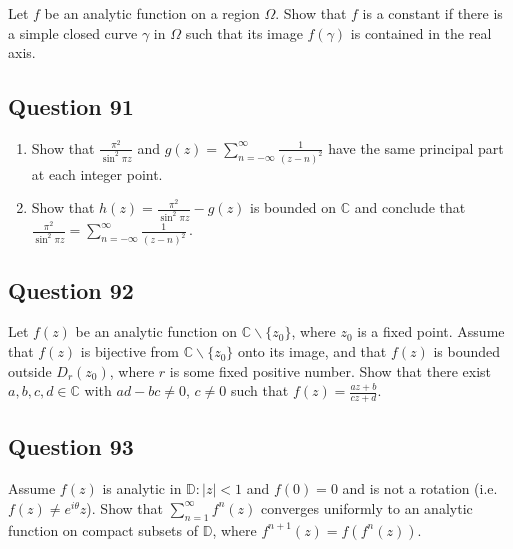\documentclass[12pt]{article}
\begin{document}
Let \(f\) be an analytic function on a region \(\Omega\). Show that
\(f\) is a constant if there is a simple closed curve \(\gamma\) in
\(\Omega\) such that its image \(f(\gamma)\) is contained in the real
axis.

\hypertarget{question-91-1}{%
\subsection{Question 91}\label{question-91-1}}

\begin{enumerate}
\def\labelenumi{(\arabic{enumi})}
\item
  Show that \(\displaystyle \frac{\pi^2}{\sin^2 \pi z}\) and
  \(\displaystyle g(z) = \sum_{n = - \infty}^{ \infty} \frac{1}{(z-n)^2}\)
  have the same principal part at each integer point.
\item
  Show that \(\displaystyle h(z) = \frac{\pi^2}{\sin^2 \pi z} - g(z)\)
  is bounded on \(\mathbb C\) and conclude that
  \(\displaystyle \frac{\pi^2}{\sin^2 \pi z} = \sum_{n = - \infty}^{ \infty} \frac{1}{(z-n)^2} \, .\)
\end{enumerate}

\hypertarget{question-92-1}{%
\subsection{Question 92}\label{question-92-1}}

Let \(f(z)\) be an analytic function on
\({\mathbb C} \backslash \{ z_0 \}\), where \(z_0\) is a fixed point.
Assume that \(f(z)\) is bijective from
\({\mathbb C} \backslash \{ z_0 \}\) onto its image, and that \(f(z)\)
is bounded outside \(D_r(z_0)\), where \(r\) is some fixed positive
number. Show that there exist \(a, b, c, d \in \mathbb C\) with
\(ad-bc \neq 0\), \(c \neq 0\) such that
\(\displaystyle f(z) = \frac{az + b}{cz + d}\).

\hypertarget{question-93-1}{%
\subsection{Question 93}\label{question-93-1}}

Assume \(f(z)\) is analytic in \(\mathbb D: |z|<1\) and \(f(0)=0\) and
is not a rotation (i.e.~\(f(z) \neq e^{i \theta} z\)). Show that
\(\displaystyle \sum_{n=1}^\infty f^{n}(z)\) converges uniformly to an
analytic function on compact subsets of \({\mathbb D}\), where
\(f^{n+1}(z) = f(f^{n}(z))\).
\end{document}
